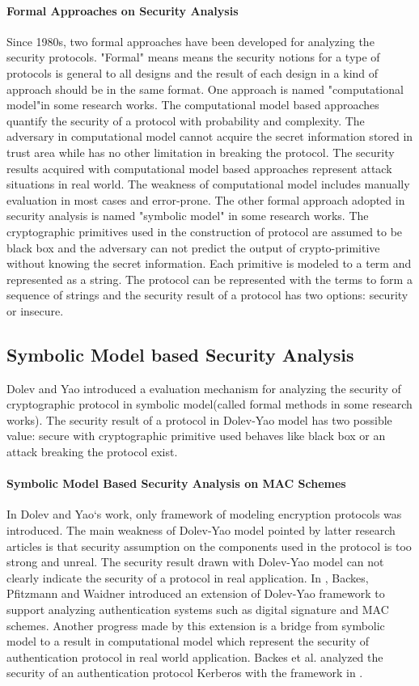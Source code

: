 \documentclass{article}
\begin{document}
\paragraph{Formal Approaches on Security Analysis}
Since 1980s, two formal approaches have been developed for analyzing the security protocols. "Formal" means means the security notions for a type of protocols is general to all designs and the result of each design in a kind of approach should be in the same format. One approach is named "computational model"in some research works. The computational model based approaches quantify the security of a protocol with probability and complexity. The adversary in computational model cannot acquire the secret information stored in trust area while has no other limitation in breaking the protocol. The security results acquired with computational model based approaches represent attack situations in real world. The weakness of computational model includes manually evaluation in most cases and error-prone. 
The other formal approach adopted in security analysis is named "symbolic model" in some research works. The cryptographic primitives used in the construction of protocol are assumed to be black box and the adversary can not predict the output of crypto-primitive without knowing the secret information. Each primitive is modeled to a term and represented as a string. The protocol can be represented with the terms to form a sequence of strings and the security result of a protocol has two options: security or insecure.  
\subsection{Symbolic Model based Security Analysis}
Dolev and Yao introduced \cite{Dolev-Yao} a evaluation mechanism for analyzing the security of cryptographic protocol in
symbolic model(called formal methods in some research works). The security result of a protocol in
Dolev-Yao model has two possible value: secure with cryptographic primitive used
behaves like black box or an attack breaking the protocol exist.  
\paragraph{Symbolic Model Based Security Analysis on MAC Schemes}
In Dolev and Yao`s work, only framework of modeling encryption protocols was
introduced. The main weakness of Dolev-Yao model pointed by latter research
articles is that security assumption on the components used in the protocol is
too strong and unreal. The security result drawn with Dolev-Yao model can not
clearly indicate the security of a protocol in real application. In
\cite{symbolic-mac},
Backes, Pfitzmann and Waidner introduced an extension of Dolev-Yao framework to
support analyzing authentication systems such as digital signature and MAC
schemes. Another progress made by this extension is a bridge from symbolic model
to a result in computational model which represent the security of
authentication protocol in real world application.  Backes et al. analyzed the security of an authentication protocol
Kerberos with the framework in \cite{symbolic-kerberos}.
\end{document}
